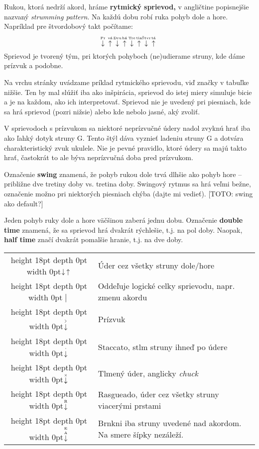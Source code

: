 Rukou, ktorá nedrží akord, hráme \textbf{rytmický sprievod,} v angličtine popisnejšie nazvaný
\emph{strumming pattern}. Na každú dobu robí ruka pohyb dole a hore. Napríklad pre štvordobový
takt počítame:
{\larger$$
\PluckDown{Pr}\ \PluckUp{vá}\ \PluckDown{Dru}\ \PluckUp{há}\ 
\PluckDown{Tre}\ \PluckUp{tia}\ \PluckDown{Štvr}\ \PluckUp{tá}\ 
$$}%
Sprievod je tvorený tým, pri ktorých pohyboch (ne)udierame struny, kde dáme prízvuk a podobne.

Na vrchu stránky uvádzame príklad rytmického sprievodu, viď značky v tabuľke nižšie.
Ten by mal slúžiť iba ako inšpirácia, sprievod do istej miery simuluje bicie a je na každom, ako ich
interpretovať. Sprievod nie je uvedený pri piesniach, kde sa hrá \uv{štandardný} sprievod (pozri nižsie)
alebo kde nebolo jasné, aký zvoliť.

V sprievodoch s prízvukom sa niektoré neprízvučné údery nadol zvyknú hrať iba ako ľahký dotyk
struny G. Tento štýl dáva vyznieť ladeniu struny G a dotvára charakteristický zvuk ukulele.
Nie je pevné pravidlo, ktoré údery sa majú takto hrať, častokrát to ale býva neprízvučná doba pred
prízvukom.

Označenie \textbf{swing} znamená, že pohyb rukou dole trvá dlhšie ako pohyb hore -- približne
dve tretiny doby vs. tretina doby. Swingový rytmus sa hrá veľmi bežne, označenie možno pri
niektorých piesniach chýba (dajte mi vedieť). [TOTO: swing ako default?]

Jeden pohyb ruky dole a hore väčšinou zaberá jednu dobu. Označenie \textbf{double time} znamená,
že sa sprievod hrá dvakrát rýchlešie, t.j. na pol doby. Naopak, \textbf{half time} značí dvakrát
pomalšie hranie, t.j. na dve doby.

\medskip

\def\mystrut{\vrule height 18pt depth 0pt width 0pt}
\begin{tabularx}{\linewidth}{ c X }
    \mystrut $\Down\Up$ & Úder cez všetky struny dole/hore \\ 
    \mystrut $\hspace{3pt}\big|\hspace{3pt}$ & Oddeľuje logické celky sprievodu, napr. zmenu akordu \\ 
    \mystrut $\AccentDown$ & Prízvuk \\  
    \mystrut $\StaccatoDown$ & Staccato, stlm struny ihneď po údere \\
    \mystrut $\ChuckDown$ & Tlmený úder, anglicky \textit{chuck} \\
    \mystrut $\PluckDown{R}$ & Rasgueado, \uv{vejárovitý} úder cez všetky struny viacerými prstami \\    
    \mystrut $\PluckDown{E A}$ & Brnkni iba struny uvedené nad akordom. Na smere šípky nezáleží. \\
\end{tabularx}


